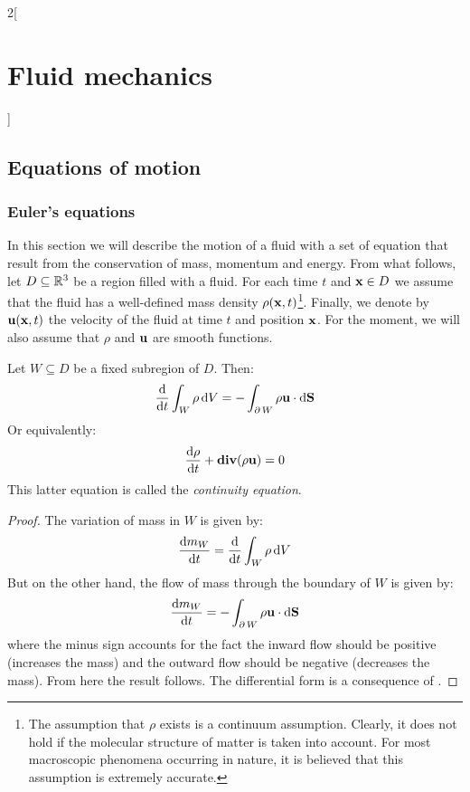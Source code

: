 \documentclass[../../../main_physics.tex]{subfiles}
\begin{document}
\renewcommand{\col}{\phy}
\begin{multicols}{2}[\section{Fluid mechanics}]
  \subsection{Equations of motion}
  \subsubsection{Euler's equations}
  In this section we will describe the motion of a fluid with a set of equation that result from the conservation of mass, momentum and energy. From what follows, let $D\subseteq \mathbb{R}^3$ be a region filled with a fluid. For each time $t$ and $\boldsymbol{\mathrm{x}}\in D$ we assume that the fluid has a well-defined mass density $\rho(\boldsymbol{\mathrm{x}},t)$\footnote{The assumption that $\rho$ exists is a continuum assumption. Clearly, it does not hold if the molecular structure of matter is taken into account. For most macroscopic phenomena occurring in nature, it is believed that this assumption is extremely accurate.}. Finally, we denote by $\boldsymbol{\mathrm{u}}(\boldsymbol{\mathrm{x}},t)$ the velocity of the fluid at time $t$ and position $\boldsymbol{\mathrm{x}}$. For the moment, we will also assume that $\rho$ and $\boldsymbol{\mathrm{u}}$ are smooth functions.
  \begin{proposition}\label{FLM:conservationofmass}
    Let $W\subseteq D$ be a fixed subregion of $D$. Then:
    $$
      \dv{}{t}\int_W\rho\dd{V}=-\int_{\operatorname{\partial}{W}}\rho\boldsymbol{\mathrm{u}}\cdot\dd{\boldsymbol{\mathrm{S}}}
    $$
    Or equivalently:
    \begin{equation}\label{FLM:continuityequation}
      \dv{\rho}{t}+\operatorname{\boldsymbol{\mathrm{div}}}(\rho\boldsymbol{\mathrm{u}})=0
    \end{equation}
    This latter equation is called the \emph{continuity equation}.
  \end{proposition}
  \begin{proof}
    The variation of mass in $W$ is given by:
    $$
      \dv{m_W}{t}=\dv{}{t} \int_W\rho\dd{V}
    $$
    But on the other hand, the flow of mass through the boundary of $W$ is given by:
    $$
      \dv{m_W}{t}=-\int_{\operatorname{\partial}{W}}\rho\boldsymbol{\mathrm{u}}\cdot\dd{\boldsymbol{\mathrm{S}}}
    $$
    where the minus sign accounts for the fact the inward flow should be positive (increases the mass) and the outward flow should be negative (decreases the mass). From here the result follows. The differential form is a consequence of .

\end{proof}
\end{multicols}
\end{document}
